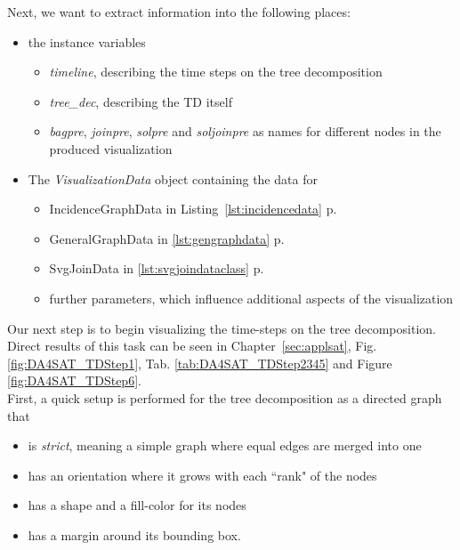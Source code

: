 \documentclass[a4paper, 12pt, bibliography=totoc]{scrartcl}
\begin{document}

Next, we want to extract information into the following places: 
\begin{itemize}
	\item the instance variables 
	\begin{itemize}
		\item \textit{timeline}, describing the time steps on the tree decomposition
		\item \textit{tree\_dec}, describing the TD itself
		\item \textit{bagpre}, \textit{joinpre}, \textit{solpre} and \textit{soljoinpre} as names for different nodes in the produced visualization
	\end{itemize}
	\item The \textit{VisualizationData} object containing the data for 
	\begin{itemize}
		\item IncidenceGraphData in Listing~\ref{lst:incidencedata} p.~\pageref{lst:incidencedata}
		\item GeneralGraphData in \ref{lst:gengraphdata} p.~\pageref{lst:gengraphdata}
		\item SvgJoinData in \ref{lst:svgjoindataclass} p.~\pageref{lst:svgjoindataclass}
		\item further parameters, which influence additional aspects of the visualization
	\end{itemize}
\end{itemize}

Our next step is to begin visualizing the time-steps on the tree decomposition. Direct results of this task can be seen in Chapter~\ref{sec:applsat}, Fig. \ref{fig:DA4SAT_TDStep1}, Tab. \ref{tab:DA4SAT_TDStep2345} and Figure \ref{fig:DA4SAT_TDStep6}.\\

First, a quick setup is performed for the tree decomposition as a directed graph that 
\begin{itemize}
	\item is \textit{strict}, meaning a simple graph where equal edges are merged into one
	\item has an orientation where it grows with each ``rank" of the nodes
	\item has a shape and a fill-color for its nodes
	\item has a margin around its bounding box.
\end{itemize}
\end{document}
